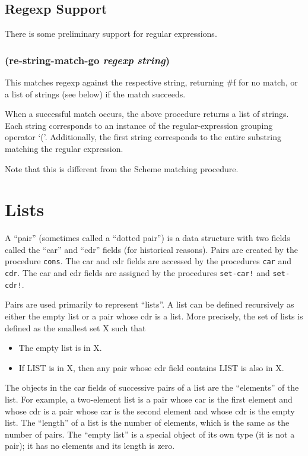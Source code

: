 \documentclass{article}
\begin{document}
\subsection{Regexp Support}\label{sec:regexp-support}

There is some preliminary support for regular expressions.

\subsubsection{(re-string-match-go \emph{regexp} \emph{string})}

This matches regexp against the respective string, returning \#f for no match, or a list of
strings (see below) if the match succeeds.

When a successful match occurs, the above procedure returns a list of strings. Each string
corresponds to an instance of the regular-expression grouping operator ‘(’. Additionally, the
first string corresponds to the entire substring matching the regular expression.

Note that this is different from the Scheme matching procedure.

\section{Lists}\label{sec:lists}

A ``pair'' (sometimes called a ``dotted pair'') is a data structure with two fields called the
``car'' and ``cdr'' fields (for historical reasons). Pairs are created by the procedure
\verb|cons|. The car and cdr fields are accessed by the procedures \verb|car| and
\verb|cdr|. The car and cdr fields are assigned by the procedures \verb|set-car!| and
\verb|set-cdr!|.

Pairs are used primarily to represent ``lists''. A list can be defined recursively as either
the empty list or a pair whose cdr is a list. More precisely, the set of lists is defined as
the smallest set X such that

\begin{itemize}
\item The empty list is in X.
\item If LIST is in X, then any pair whose cdr field contains LIST is also in X.
\end{itemize}

The objects in the car fields of successive pairs of a list are the ``elements'' of the list.
For example, a two-element list is a pair whose car is the first element and whose cdr is a
pair whose car is the second element and whose cdr is the empty list. The ``length'' of a list
is the number of elements, which is the same as the number of pairs. The ``empty list'' is a
special object of its own type (it is not a pair); it has no elements and its length is zero.
\end{document}
